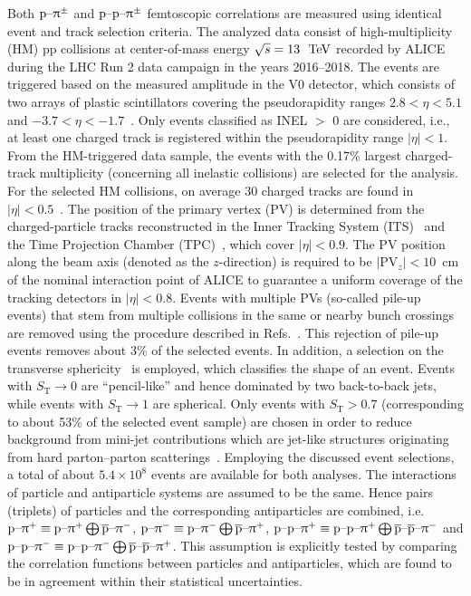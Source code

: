 \documentclass[ALICE,manyauthors]{cernphprep}
\begin{document}
Both $\text{p--}\uppi^\pm$ and $\text{p--p--}\uppi^\pm$ femtoscopic correlations are measured using identical event and track selection criteria. The analyzed data consist of high-multiplicity (HM) pp collisions at center-of-mass energy $\sqrt{s} =13~\text{ TeV}$ recorded by ALICE~\cite{ALICE:2008ngc, ALICE:2014sbx, ALICE:2022wpn} during the LHC Run 2 data campaign in the years 2016--2018. The events are triggered based on the measured amplitude in the V0 detector, which consists of two arrays of plastic scintillators covering the pseudorapidity ranges $2.8 < \eta < 5.1$ and $-3.7 < \eta < -1.7$~\cite{ALICE:2013axi}. Only events classified as INEL $>$ 0 are considered, i.e., at least one charged track is registered within the pseudorapidity
range $|\eta| < 1$. From the HM-triggered data sample, the events with the 0.17\% largest charged-track multiplicity (concerning all inelastic collisions) are selected for the analysis. For the selected HM collisions, on average 30 charged tracks are found in $|\eta| < 0.5$~\cite{ALICE:2020mfd}. The position of the primary vertex (PV) is determined from the charged-particle tracks reconstructed in the Inner Tracking System (ITS)~\cite{ALICE:2008ngc,ALICE:2010tia} and the Time Projection Chamber (TPC)~\cite{Alme:2010ke}, which cover $|\eta| < 0.9$. The PV position along the beam axis (denoted as the $z$-direction) is required to be $|\text{PV}_z|<10$~cm of the nominal interaction point of ALICE to guarantee a uniform coverage of the tracking detectors in $|\eta| < 0.8$. Events with multiple PVs (so-called pile-up events) that stem from multiple collisions in the same or nearby bunch crossings are removed using the procedure described in Refs.~\cite{ALICE:2018ysd, ALICE:2019hdt, ppSourceErratum}. This rejection of pile-up events removes about 3\% of the selected events. In addition, a selection on the transverse sphericity~\cite{ALEPH:2003obs, ALICE:2019bdw, ALICE:2012cor, ALICE:2023zbh} is employed, which classifies the shape of an event. Events with $S_\text{T}\rightarrow 0$ are ``pencil-like'' and hence dominated by two back-to-back jets, while events with $S_\text{T}\rightarrow 1$ are spherical. Only events with $S_\text{T} > 0.7$ (corresponding to about 53\% of the selected event sample) are chosen in order to reduce background from mini-jet contributions which are jet-like structures originating from hard parton--parton scatterings~\cite{ALICE:2019gcn, ALICE:2021cpv, ALICE:2021cyj, ALICE:2023wjz}. Employing the discussed event selections, a total of about $5.4\times10^8$ events are available for both analyses. The interactions of particle and antiparticle systems are assumed to be the same. Hence pairs (triplets) of particles and the corresponding antiparticles are combined, i.e. $\text{p--}\uppi^+ \equiv \text{p--}\uppi^+ \bigoplus \overline{\text{p}}\text{--}\uppi^-$, $\text{p--}\uppi^- \equiv \text{p--}\uppi^- \bigoplus \overline{\text{p}}\text{--}\uppi^+$, $\text{p--p--}\uppi^+ \equiv \text{p--p--}\uppi^+ \bigoplus \overline{\text{p}}\text{--}\overline{\text{p}}\text{--}\uppi^-$ and  $\text{p--p--}\uppi^- \equiv \text{p--p--}\uppi^- \bigoplus \overline{\text{p}}\text{--}\overline{\text{p}}\text{--}\mathrm{\uppi}^+$. This assumption is explicitly tested by comparing the correlation functions between particles and antiparticles, which are found to be in agreement within their statistical uncertainties.
\end{document}
